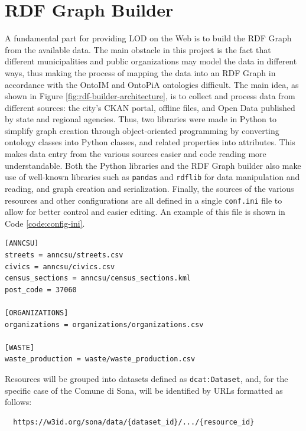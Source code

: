 \chapter{RDF Graph Builder}
\label{chp:rdf-builder}

A fundamental part for providing \acl{LOD} on the Web is to build the \ac{RDF} Graph from the available data. The main obstacle in this project is the fact that different municipalities and public organizations may model the data in different ways, thus making the process of mapping the data into an \ac{RDF} Graph in accordance with the \ac{OntoIM} and OntoPiA ontologies difficult. The main idea, as shown in Figure \ref{fig:rdf-builder-architecture}, is to collect and process data from different sources: the city's CKAN portal, offline files, and Open Data published by state and regional agencies. Thus, two libraries were made in Python to simplify graph creation through object-oriented programming by converting ontology classes into Python classes, and related properties into attributes. This makes data entry from the various sources easier and code reading more understandable. Both the Python libraries and the \ac{RDF} Graph builder also make use of well-known libraries such as \verb#pandas# and \verb#rdflib# for data manipulation and reading, and graph creation and serialization. Finally, the sources of the various resources and other configurations are all defined in a single \verb#conf.ini# file to allow for better control and easier editing. An example of this file is shown in Code \ref{code:config-ini}.

\begin{lstlisting}[caption={Example of a config.ini file that defines sources for some semantic areas.},label=code:config-ini]
[ANNCSU]
streets = anncsu/streets.csv
civics = anncsu/civics.csv
census_sections = anncsu/census_sections.kml
post_code = 37060

[ORGANIZATIONS]
organizations = organizations/organizations.csv

[WASTE]
waste_production = waste/waste_production.csv
\end{lstlisting}

Resources will be grouped into datasets defined as \verb#dcat:Dataset#, and, for the specific case of the Comune di Sona, will be identified by \acp{URL} formatted as follows:

\begin{verbatim}
  https://w3id.org/sona/data/{dataset_id}/.../{resource_id}
\end{verbatim}

